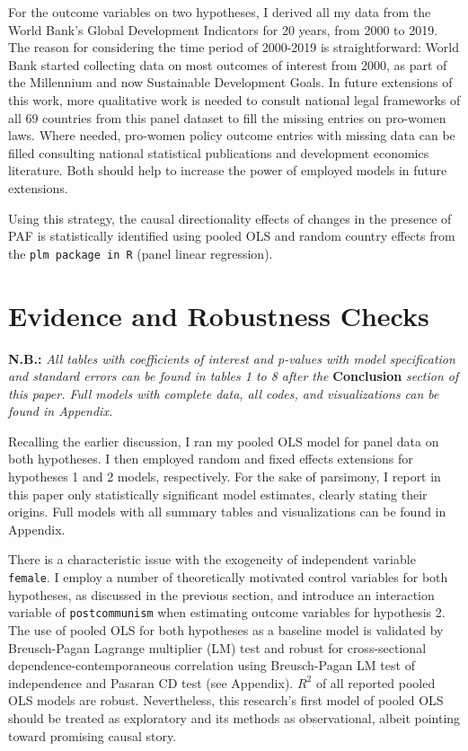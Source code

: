 \documentclass[12pt]{article}
\begin{document}
For the outcome variables on two hypotheses, I derived all my data from the World Bank's Global Development Indicators for 20 years, from 2000 to 2019. The reason for considering the time period of 2000-2019 is straightforward: World Bank started collecting data on most outcomes of interest from 2000, as part of the Millennium and now Sustainable Development Goals. In future extensions of this work, more qualitative work is needed to consult national legal frameworks of all 69 countries from this panel dataset to fill the missing entries on pro-women laws. Where needed, pro-women policy outcome entries with missing data can be filled consulting national statistical publications and development economics literature. Both should help to increase the power of employed models in future extensions. 

Using this strategy, the causal directionality effects of changes in the presence of PAF is statistically identified using pooled OLS and random country effects from the \texttt{plm package in R} (panel linear regression). 

\section*{Evidence and Robustness Checks}

\textbf{N.B.:} \textit{All tables with coefficients of interest and p-values with model specification and standard errors can be found in tables 1 to 8 after the }\textbf{Conclusion} \textit{section of this paper. Full models with complete data, all codes, and visualizations can be found in Appendix.} 

Recalling the earlier discussion, I ran my pooled OLS model for panel data on both hypotheses. I then employed random and fixed effects extensions for hypotheses 1 and 2 models, respectively. For the sake of parsimony, I report in this paper only statistically significant model estimates, clearly stating their origins. Full models with all summary tables and visualizations can be found in Appendix. 

There is a characteristic issue with the exogeneity of independent variable \texttt{female}. I employ a number of theoretically motivated control variables for both hypotheses, as discussed in the previous section, and introduce an interaction variable of \texttt{postcommunism} when estimating outcome variables for hypothesis 2. The use of pooled OLS for both hypotheses as a baseline model is validated by Breusch-Pagan Lagrange multiplier (LM) test and robust for cross-sectional dependence-contemporaneous correlation using Breusch-Pagan LM test of independence and Pasaran CD test (see Appendix). $R^2$ of all reported pooled OLS models are robust. Nevertheless, this research's first model of pooled OLS should be treated as exploratory and its methods as observational, albeit pointing toward promising causal story. 
\end{document}
